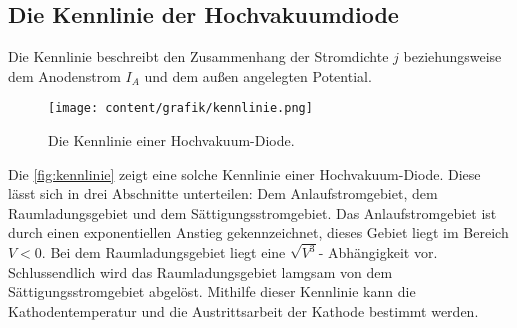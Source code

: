 \subsection{Die Kennlinie der Hochvakuumdiode}
\label{sec:Die Kennlinie der Hochvakuumdiode}

Die Kennlinie beschreibt den Zusammenhang der Stromdichte $j$ beziehungsweise dem Anodenstrom $I_A$ 
und dem außen angelegten Potential.

\begin{figure}[H]
    \centering
    \texttt{[image: content/grafik/kennlinie.png]}
    \caption{Die Kennlinie einer Hochvakuum-Diode.\cite{elektron}}
    \label{fig:kennlinie}
\end{figure}

Die \autoref{fig:kennlinie} zeigt eine solche Kennlinie einer Hochvakuum-Diode.  Diese lässt sich in drei Abschnitte 
unterteilen: Dem Anlaufstromgebiet, dem Raumladungsgebiet und dem Sättigungsstromgebiet. Das Anlaufstromgebiet ist durch einen
exponentiellen Anstieg gekennzeichnet, dieses Gebiet liegt im Bereich $V < 0$. Bei dem Raumladungsgebiet liegt eine
$\sqrt{V^3}$- Abhängigkeit vor. Schlussendlich wird das Raumladungsgebiet lamgsam von dem Sättigungsstromgebiet abgelöst. 
Mithilfe dieser Kennlinie kann die Kathodentemperatur und die Austrittsarbeit der Kathode bestimmt werden.
